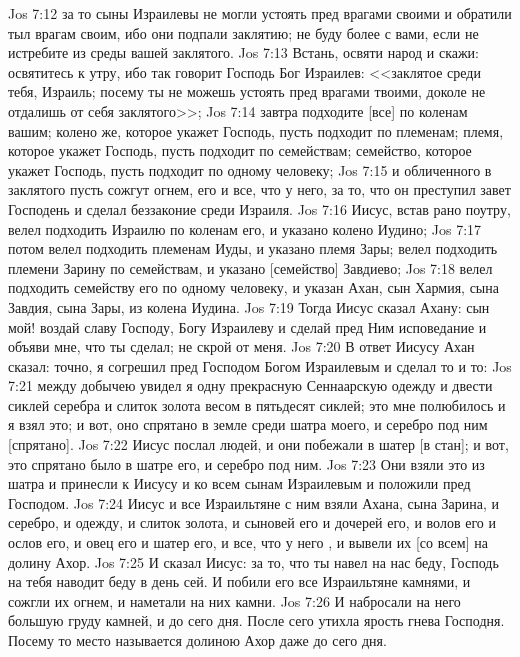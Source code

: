 \vs Jos 7:12 за то сыны Израилевы не могли устоять пред врагами своими и обратили тыл врагам своим, ибо они подпали заклятию; не буду более с вами, если не истребите из среды вашей заклятого.
\vs Jos 7:13 Встань, освяти народ и скажи: освятитесь к утру, ибо так говорит Господь Бог Израилев: <<заклятое среди тебя, Израиль; посему ты не можешь устоять пред врагами твоими, доколе не отдалишь от себя заклятого>>;
\vs Jos 7:14 завтра подходите [все] по коленам вашим; колено же, которое укажет Господь, пусть подходит по племенам; племя, которое укажет Господь, пусть подходит по семействам; семейство, которое укажет Господь, пусть подходит по одному человеку;
\vs Jos 7:15 и обличенного в  заклятого пусть сожгут огнем, его и все, что у него, за то, что он преступил завет Господень и сделал беззаконие среди Израиля.
\rsbpar\vs Jos 7:16 Иисус, встав рано поутру, велел подходить Израилю по коленам его, и указано колено Иудино;
\vs Jos 7:17 потом велел подходить племенам Иуды, и указано племя Зары; велел подходить племени Зарину по семействам, и указано [семейство] Завдиево;
\vs Jos 7:18 велел подходить семейству его по одному человеку, и указан Ахан, сын Хармия, сына Завдия, сына Зары, из колена Иудина.
\vs Jos 7:19 Тогда Иисус сказал Ахану: сын мой! воздай славу Господу, Богу Израилеву и сделай пред Ним исповедание и объяви мне, что ты сделал; не скрой от меня.
\vs Jos 7:20 В ответ Иисусу Ахан сказал: точно, я согрешил пред Господом Богом Израилевым и сделал то и то:
\vs Jos 7:21 между добычею увидел я одну прекрасную Сеннаарскую одежду и двести сиклей серебра и слиток золота весом в пятьдесят сиклей; это мне полюбилось и я взял это; и вот, оно спрятано в земле среди шатра моего, и серебро под ним [спрятано].
\vs Jos 7:22 Иисус послал людей, и они побежали в шатер [в стан]; и вот,  это спрятано было в шатре его, и серебро под ним.
\vs Jos 7:23 Они взяли это из шатра и принесли к Иисусу и ко всем сынам Израилевым и положили пред Господом.
\vs Jos 7:24 Иисус и все Израильтяне с ним взяли Ахана, сына Зарина, и серебро, и одежду, и слиток золота, и сыновей его и дочерей его, и волов его и ослов его, и овец его и шатер его, и все, что у него , и вывели их [со всем] на долину Ахор.
\vs Jos 7:25 И сказал Иисус: за то, что ты навел на нас беду, Господь на тебя наводит беду в день сей. И побили его все Израильтяне камнями, и сожгли их огнем, и наметали на них камни.
\vs Jos 7:26 И набросали на него большую груду камней,  и до сего дня. После сего утихла ярость гнева Господня. Посему то место называется долиною Ахор даже до сего дня.
